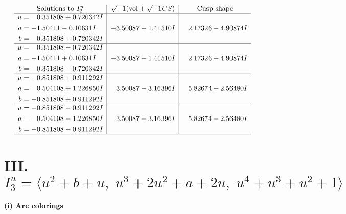 \documentclass[1p]{elsarticle_modified}
\theoremstyle{definition}
\newcommand{\I}{\sqrt{-1}}
\begin{document}
$$\begin{array}{c|c|c}  
\text{Solutions to }I^u_{2}& \I (\text{vol} + \sqrt{-1}CS) & \text{Cusp shape}\\
 \hline 
\begin{aligned}
u &= \phantom{-}0.351808 + 0.720342 I \\
a &= -1.50411 - 0.10631 I \\
b &= \phantom{-}0.351808 + 0.720342 I\end{aligned}
 & -3.50087 + 1.41510 I & \phantom{-}2.17326 - 4.90874 I \\ \hline\begin{aligned}
u &= \phantom{-}0.351808 - 0.720342 I \\
a &= -1.50411 + 0.10631 I \\
b &= \phantom{-}0.351808 - 0.720342 I\end{aligned}
 & -3.50087 - 1.41510 I & \phantom{-}2.17326 + 4.90874 I \\ \hline\begin{aligned}
u &= -0.851808 + 0.911292 I \\
a &= \phantom{-}0.504108 + 1.226850 I \\
b &= -0.851808 + 0.911292 I\end{aligned}
 & \phantom{-}3.50087 - 3.16396 I & \phantom{-}5.82674 + 2.56480 I \\ \hline\begin{aligned}
u &= -0.851808 - 0.911292 I \\
a &= \phantom{-}0.504108 - 1.226850 I \\
b &= -0.851808 - 0.911292 I\end{aligned}
 & \phantom{-}3.50087 + 3.16396 I & \phantom{-}5.82674 - 2.56480 I\\
 \hline 
 \end{array}$$\newpage\newpage\renewcommand{\arraystretch}{1}
\centering \section*{III. $I^u_{3}= \langle u^2+b+u,\;u^3+2 u^2+a+2 u,\;u^4+u^3+u^2+1 \rangle$}
\flushleft \textbf{(i) Arc colorings}\\
\end{document}
